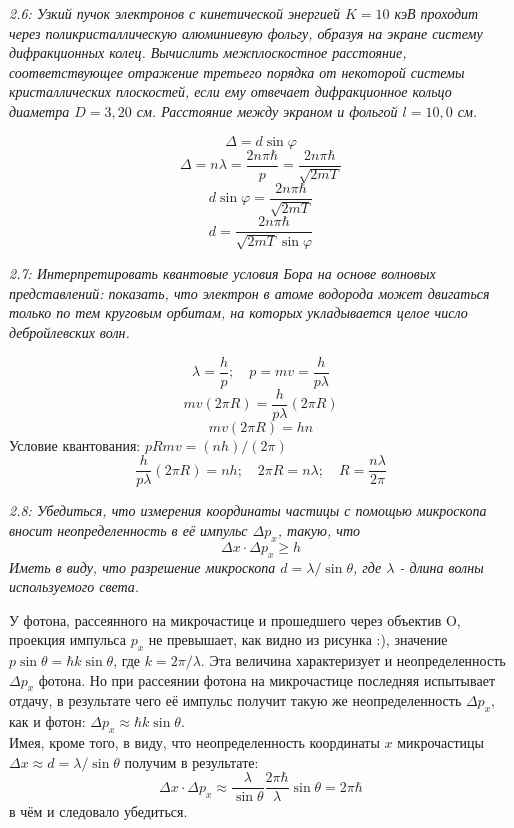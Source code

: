 	\emph{2.6: Узкий пучок электронов с кинетической энергией \( K = 10 \) 
		кэВ проходит через поликристаллическую алюминиевую фольгу, 
		образуя на экране систему дифракционных колец. 
		Вычислить межплоскостное расстояние, соответствующее отражение 
		третьего порядка от некоторой системы кристаллических плоскостей, 
		если ему отвечает дифракционное кольцо диаметра \( D = 3,20 \) см. 
		Расстояние между экраном и фольгой \( l = 10,0 \) см.}

        \[ \Delta = d\sin\varphi \]
        \[ 
            \Delta = n\lambda = \frac{2n\pi\hbar}{p} = 
            \frac{2n\pi\hbar}{\sqrt{2mT}} 
        \]
        \[ d\sin\varphi = \frac{2n\pi\hbar}{\sqrt{2mT}} \]
        \[ d = \frac{2n\pi\hbar}{\sqrt{2mT}\sin\varphi} \]

	\emph{2.7: Интерпретировать квантовые условия Бора на основе волновых
		представлений: показать, что электрон в атоме водорода может 
		двигаться только по тем круговым орбитам, на которых укладывается 
		целое число дебройлевских волн.}

        \[ 
            \lambda = \frac{h}{p};\quad 
            p = mv = \frac{h}{p\lambda}
        \]
        \[ mv(2\pi R) = \frac{h}{p\lambda}(2\pi R) \]
        \[ mv(2\pi R) = hn \]
        Условие квантования: \( pRmv = (nh)/(2\pi) \)
        \[
            \frac{h}{p\lambda}(2\pi R) = nh;\quad
            2\pi R = n\lambda;\quad
            R = \frac{n\lambda}{2\pi}
        \]

	\emph{2.8: Убедиться, что измерения координаты частицы с помощью 
		микроскопа вносит неопределенность в её импульс \( \Delta p_x \), 
		такую, что \[ \Delta x\cdot\Delta p_x \geq h \] Иметь в виду, 
		что разрешение микроскопа \( d = \lambda/\sin\theta \), 
		где \( \lambda \) - длина волны используемого света.}

        У фотона, рассеянного на микрочастице и прошедшего через 
        объектив O, проекция импульса \( p_x \) не превышает, как 
        видно из рисунка :), значение 
        \( p\sin\theta = \hbar k\sin\theta \), где 
        \( k = 2\pi/\lambda \). Эта величина характеризует и 
        неопределенность \( \Delta p_x \) фотона. Но при рассеянии 
        фотона на микрочастице последняя испытывает отдачу, в 
        результате чего её импульс получит такую же неопределенность 
        \( \Delta p_x \), как и фотон: 
        \( \Delta p_x \approx \hbar k\sin\theta \). \\
        Имея, кроме того, в виду, что неопределенность координаты 
        \( x \) микрочастицы \( \Delta x \approx d = \lambda/\sin\theta \) 
        получим в результате: 
        \[ 
            \Delta x\cdot\Delta p_x \approx \frac{\lambda}{\sin\theta}
            \frac{2\pi\hbar}{\lambda}\sin\theta = 2\pi\hbar
        \]
        в чём и следовало убедиться.\\

